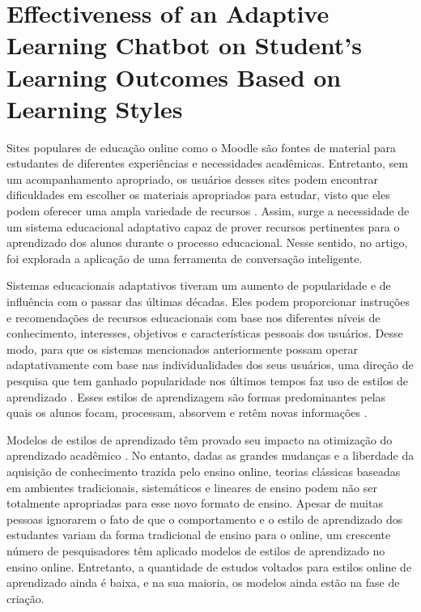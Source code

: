 \section{Effectiveness of an Adaptive Learning Chatbot on Student's Learning Outcomes Based on Learning Styles \cite{kaiss2023}}
\label{sec:kaiss2023}

Sites populares de educação online como o Moodle são fontes de material para estudantes de diferentes experiências e necessidades acadêmicas. Entretanto, sem um acompanhamento apropriado, os usuários desses sites podem encontrar dificuldades em escolher os materiais apropriados para estudar, visto que eles podem oferecer uma ampla variedade de recursos . Assim, surge a necessidade de um sistema educacional adaptativo capaz de prover recursos pertinentes para o aprendizado dos alunos durante o processo educacional. Nesse sentido, no artigo, foi explorada a aplicação de uma ferramenta de conversação inteligente.

Sistemas educacionais adaptativos tiveram um aumento de popularidade e de influência com o passar das últimas décadas. Eles podem proporcionar instruções e recomendações de recursos educacionais com base nos diferentes níveis de conhecimento, interesses, objetivos e características pessoais dos usuários. Desse modo, para que os sistemas mencionados anteriormente possam operar adaptativamente com base nas individualidades dos seus usuários, uma direção de pesquisa que tem ganhado popularidade nos últimos tempos faz uso de estilos de aprendizado . Esses estilos de aprendizagem são formas predominantes pelas quais os alunos focam, processam, absorvem e retêm novas informações .

Modelos de estilos de aprendizado têm provado seu impacto na otimização do aprendizado acadêmico . No entanto, dadas as grandes mudanças e a liberdade da aquisição de conhecimento trazida pelo ensino online, teorias clássicas baseadas em ambientes tradicionais, sistemáticos e lineares de ensino podem não ser totalmente apropriadas para esse novo formato de ensino. Apesar de muitas pessoas ignorarem o fato de que o comportamento e o estilo de aprendizado dos estudantes variam da forma tradicional de ensino para o online, um crescente número de pesquisadores têm aplicado modelos de estilos de aprendizado no ensino online. Entretanto, a quantidade de estudos voltados para estilos online de aprendizado ainda é baixa, e na sua maioria, os modelos ainda estão na fase de criação.

